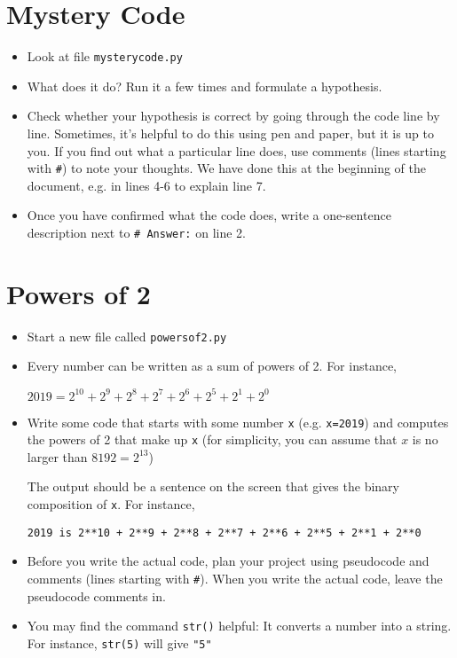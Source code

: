 \documentclass[pdflatex,a4paper]{article}
\begin{document}
\section{Mystery Code}
\begin{itemize}
\item
Look at file \verb=mysterycode.py=
\item
What does it do? Run it a few times and formulate a hypothesis. 
\item
Check whether your hypothesis is correct by going through the code line by line. Sometimes, it's helpful to do this using pen and paper, but it is up to you. If you find out what a particular line does, use comments (lines starting with \verb=#=) to note your thoughts. We have done this at the beginning of the document, e.g. in lines 4-6 to explain line 7. 
\item
Once you have confirmed what the code does, write a one-sentence description next to \verb=# Answer:= on line 2.
\end{itemize}




\section{Powers of 2}

\begin{itemize}
\item
Start a new file called \verb=powersof2.py=
\item
Every number can be written as a sum of powers of 2. For instance,

\(
2019 = 2^{10} + 2^{9} + 2^{8} + 2^{7} + 2^{6} + 2^{5} + 2^{1} + 2^{0}
\)
\item
Write some code that starts with some number \verb=x= (e.g. \verb_x=2019_) and computes the powers of 2 that make up \verb=x= (for simplicity, you can assume that \(x\) is no larger than \(8192=2^{13}\))  

The output should be a sentence on the screen that gives the binary composition of \verb=x=. For instance,

\begin{verbatim}
2019 is 2**10 + 2**9 + 2**8 + 2**7 + 2**6 + 2**5 + 2**1 + 2**0
\end{verbatim}
\item
Before you write the actual code, plan your project using pseudocode and comments (lines starting with \verb=#=). When you write the actual code, leave the pseudocode comments in.
\item
You may find the command \verb=str()= helpful: It converts a number into a string. For instance, \verb=str(5)= will give \verb="5"=
\end{itemize}
\end{document}
